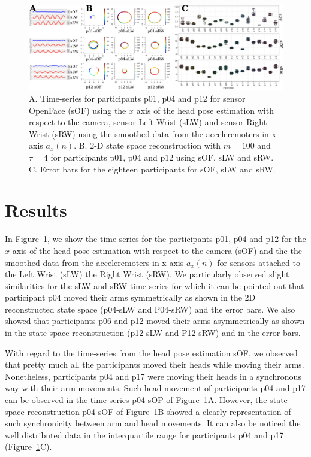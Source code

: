 \documentclass{sigchi}
\begin{document}
\begin{figure}[!htb]
\centering
\includegraphics[width=1.00\textwidth]{figures/results/main/fig_v02}
\caption[PA]{
A. Time-series for participants p01, p04 and p12 for sensor OpenFace (sOF)
using the $x$ axis of the head pose estimation with respect to the camera,
sensor Left Wrist (sLW) and sensor Right Wrist (sRW) using the smoothed data
from the acceleremoters in x axis $a_x(n)$.
B. 2-D state space reconstruction with $m=100$ and $\tau=4$ for
participants p01, p04 and p12 using sOF, sLW and sRW.
C. Error bars for the eighteen participants for sOF, sLW and sRW. }
\label{fig:main}
\end{figure}

\section{Results}
In Figure~\ref{fig:main}, we show the time-series for the participants
p01, p04 and p12 for the $x$ axis of the head pose estimation with respect to the camera (sOF)
and the the smoothed data from the acceleremoters in x axis $a_x(n)$
for sensors attached to the Left Wrist (sLW) the Right Wrist (sRW).
We particularly observed slight similarities for the sLW and sRW time-series
for which it can be pointed out that participant p04 moved their arms symmetrically
as shown in the 2D reconstructed state space (p04-sLW and P04-sRW) and the error bars.
We also showed that participants p06 and p12 moved their arms asymmetrically as shown
in the state space reconstruction (p12-sLW and P12-sRW) and in the error bars.

With regard to the time-series from the head pose estimation sOF, we observed
that pretty much all the participants moved their heads while moving their arms.
Nonetheless, participants p04 and p17 were moving their heads in a synchronous way
with their arm movements. Such head movement of participants p04 and p17 can be
observed in the time-series p04-sOP of Figure~\ref{fig:main}A. However, the
state space reconstruction p04-sOF of Figure~\ref{fig:main}B showed a clearly
representation of such synchronicity between arm and head movements.
It can also be noticed the well distributed data in the interquartile range for
participants p04 and p17 (Figure~\ref{fig:main}C).
\end{document}
